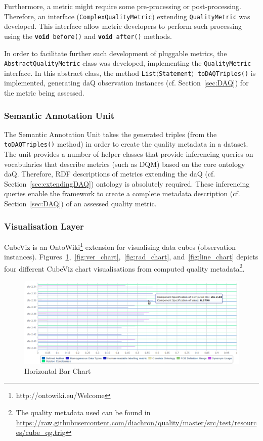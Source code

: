 Furthermore, a metric might require some pre-processing or post-processing.
Therefore, an interface (\texttt{ComplexQualityMetric}) extending \texttt{QualityMetric} was developed.
This interface allow metric developers to perform such processing using the \texttt{\textbf{void} before()} and \texttt{\textbf{void} after()} methods.

In order to facilitate further such development of pluggable metrics, the \texttt{AbstractQualityMetric} class was developed, implementing the \texttt{QualityMetric} interface.
In this abstract class, the method \texttt{List$\langle$Statement$\rangle$ toDAQTriples()} is implemented, generating daQ observation instances (cf. Section~\ref{sec:DAQ}) for the metric being assessed. 

\subsubsection{Semantic Annotation Unit}
The Semantic Annotation Unit takes the generated triples (from the \texttt{toDAQTriples()} method) in order to create the quality metadata in a dataset.
The unit provides a number of helper classes that provide inferencing queries on vocabularies that describe metrics (such as DQM) based on the core ontology daQ.
Therefore, RDF descriptions of metrics extending the daQ (cf. Section~\ref{sec:extendingDAQ}) ontology is absolutely required.
These inferencing queries enable the framework to create a complete metadata description (cf. Section~\ref{sec:DAQ}) of an assessed quality metric.

\subsubsection{Visualisation Layer}
\label{sec:vislayer_hla}
CubeViz is an OntoWiki\footnote{http://ontowiki.eu/Welcome} extension for visualising data cubes (observation instances).
Figures~\ref{fig:hor_chart},~\ref{fig:ver_chart},~\ref{fig:rad_chart}, and~\ref{fig:line_chart} depicts four different CubeViz chart visualisations from computed quality metadata\footnote{The quality metadata used can be found in \url{https://raw.githubusercontent.com/diachron/quality/master/src/test/resources/cube_qg.trig}}.

\begin{figure}[tbph]
\center
  \includegraphics[scale=0.3]{images/cube_1.png}
\caption{Horizontal Bar Chart} 
  \label{fig:hor_chart}
\end{figure}

